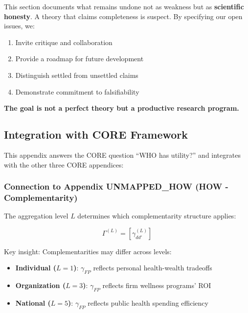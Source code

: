 \begin{tcolorbox}[colback=blue!5!white, colframe=blue!75!black, title=Commitment to Scientific Integrity]
This section documents what remains undone not as weakness but as \textbf{scientific 
honesty}. A theory that claims completeness is suspect. By specifying our open 
issues, we:
\begin{enumerate}[nosep]
\item Invite critique and collaboration
\item Provide a roadmap for future development
\item Distinguish settled from unsettled claims
\item Demonstrate commitment to falsifiability
\end{enumerate}

\textbf{The goal is not a perfect theory but a productive research program.}
\end{tcolorbox}




\subsection{Integration with CORE Framework}
\label{sec:AAA-core-integration}

This appendix answers the CORE question ``WHO has utility?'' and integrates 
with the other three CORE appendices:

\subsubsection{Connection to Appendix UNMAPPED_HOW (HOW - Complementarity)}

The aggregation level $L$ determines which complementarity structure applies:

\begin{equation}
\Gamma^{(L)} = [\gamma_{dd'}^{(L)}]
\end{equation}

Key insight: Complementarities may differ across levels:
\begin{itemize}
    \item \textbf{Individual ($L=1$)}: $\gamma_{FP}$ reflects personal health-wealth tradeoffs
    \item \textbf{Organization ($L=3$)}: $\gamma_{FP}$ reflects firm wellness programs' ROI
    \item \textbf{National ($L=5$)}: $\gamma_{FP}$ reflects public health spending efficiency
\end{itemize}

